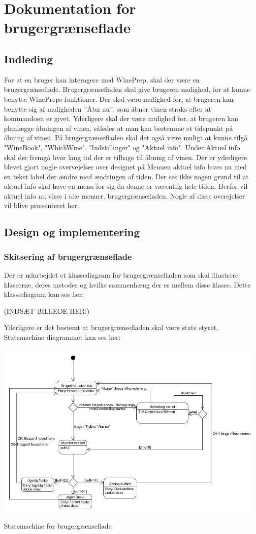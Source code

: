 \chapter*{Dokumentation for brugergrænseflade}

\section*{Indleding}

For at en bruger kan interagere med WinePrep, skal der være en brugergrænseflade. Brugergrænsefladen skal give brugeren mulighed, for at kunne benytte WinePreps funktioner. Der skal være mulighed for, at brugeren kan benytte sig af muligheden ”Åbn nu”, som åbner vinen straks efter at kommandoen er givet. Yderligere skal der være mulighed for, at brugeren kan planlægge åbningen af vinen, således at man kan bestemme et tidspunkt på åbning af vinen. På brugergrænsefladen skal det også være muligt at kunne tilgå "WineBook", "WhichWine", "Indstillinger" og "Aktuel info". Under Aktuel info skal der fremgå hvor lang tid der er tilbage til åbning af vinen. Der er yderligere blevet gjort nogle overvejelser over designet på
Menuen aktuel info laves nu med en tekst label der ændre med ændringen af tiden. Der ses ikke nogen grund til at aktuel info skal have en menu for sig da denne er væsentlig hele tiden. Derfor vil aktuel info nu vises i alle menuer. brugergrænsefladen. Nogle af disse overejelser vil blive præsenteret her. 

\section*{Design og implementering}
\subsection*{Skitsering af brugergrænseflade}

Der er udarbejdet et klassediagram for brugergrænsefladen som skal illustrere klasserne, deres metoder og hvilke sammenhæng der er mellem disse klasse. Dette klassediagram kan ses her:

(INDSÆT BILLEDE HER:)

Yderligere er det bestemt at brugergrænsefladen skal være state styret. Statemachine diagrammet kan ses her:

\includegraphics{Billeder/sm}
\caption{Statemachine for brugergrænseflade}

